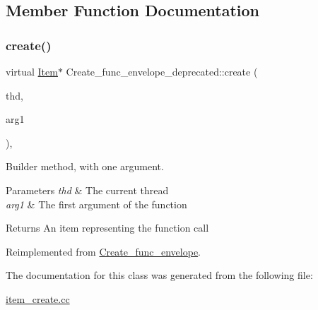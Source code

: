 \subsection{Member Function Documentation}
\mbox{\label{classCreate__func__envelope__deprecated_ad9485348b65fe2ecd722cf2810fa0e9c}} 
\subsubsection{\texorpdfstring{create()}{create()}}
{\footnotesize\ttfamily virtual \mbox{\hyperlink{classItem}{Item}}$\ast$ Create\+\_\+func\+\_\+envelope\+\_\+deprecated\+::create (\begin{DoxyParamCaption}\item[{T\+HD $\ast$}]{thd,  }\item[{\mbox{\hyperlink{classItem}{Item}} $\ast$}]{arg1 }\end{DoxyParamCaption})\hspace{0.3cm}{\ttfamily [inline]}, {\ttfamily [virtual]}}

Builder method, with one argument. 
\begin{DoxyParams}{Parameters}
{\em thd} & The current thread \\
\hline
{\em arg1} & The first argument of the function \\
\hline
\end{DoxyParams}
\begin{DoxyReturn}{Returns}
An item representing the function call 
\end{DoxyReturn}


Reimplemented from \mbox{\hyperlink{classCreate__func__envelope_a7d2f9842672a527c792c1f25ee7a45f9}{Create\+\_\+func\+\_\+envelope}}.



The documentation for this class was generated from the following file\+:\begin{DoxyCompactItemize}
\item 
\mbox{\hyperlink{item__create_8cc}{item\+\_\+create.\+cc}}\end{DoxyCompactItemize}
